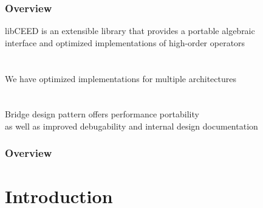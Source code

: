 \documentclass{beamer}
\begin{document}
\begin{frame}
\begin{center}
\frametitle{Overview}

libCEED is an extensible library that provides a portable algebraic\\
interface and optimized implementations of high-order operators\\

~\\

~\\

We have optimized implementations for multiple architectures\\

~\\

~\\

Bridge design pattern offers performance portability\\
as well as improved debugability and internal design documentation

\end{center}
\end{frame}
 

\begin{frame}
\frametitle{Overview} %
\tableofcontents %
\end{frame}


\section{Introduction}
\end{document}

